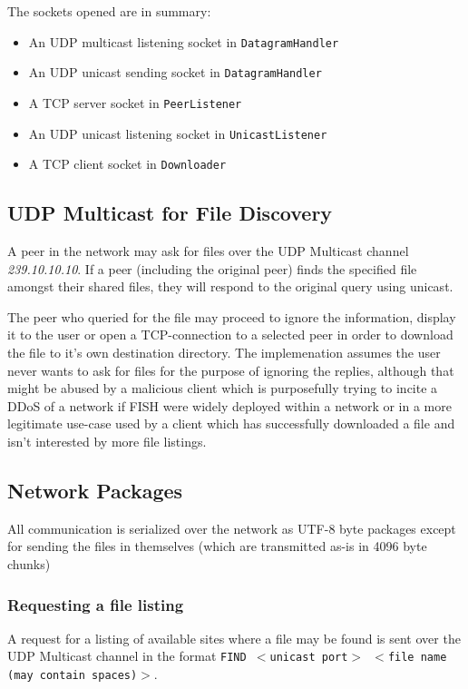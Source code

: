 \documentclass[11pt]{article}
\begin{document}
The sockets opened are in summary:

\begin{itemize}
    \item An UDP multicast listening socket in \texttt{DatagramHandler}
    \item An UDP unicast sending socket in \texttt{DatagramHandler}
    \item A TCP server socket in \texttt{PeerListener}
    \item An UDP unicast listening socket in \texttt{UnicastListener}
    \item A TCP client socket in \texttt{Downloader}
\end{itemize}

\subsection{UDP Multicast for File Discovery}

A peer in the network may ask for files over the UDP Multicast channel
\textit{239.10.10.10}. If a peer (including the original peer) finds the
specified file amongst their shared files, they will respond to the original
query using unicast.

The peer who queried for the file may proceed to ignore the information,
display it to the user or open a TCP-connection to a selected peer in order
to download the file to it's own destination directory. The implemenation
assumes the user never wants to ask for files for the purpose of ignoring the
replies, although that might be abused by a malicious client which is
purposefully trying to incite a DDoS of a network if FISH were widely deployed
within a network or in a more legitimate use-case used by a client which has
successfully downloaded a file and isn't interested by more file listings.


\subsection{Network Packages}

All communication is serialized over the network as UTF-8 byte packages except
for sending the files in themselves (which are transmitted as-is in 4096 byte
chunks)

\subsubsection{Requesting a file listing}

A request for a listing of available sites where a file may be found is sent
over the UDP Multicast channel in the format
\texttt{FIND $<$unicast port$>$ $<$file name (may contain spaces)$>$}.
\end{document}
